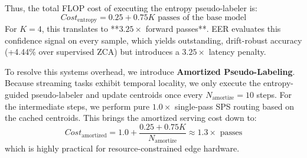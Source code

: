 Thus, the total FLOP cost of executing the entropy pseudo-labeler is:
\begin{equation}
Cost_{\text{entropy}} = 0.25 + 0.75 K \text{ passes of the base model}
\label{eq:cost_entropy}
\end{equation}
For $K=4$, this translates to **$3.25\times$ forward passes**. EER evaluates this confidence signal on every sample, which yields outstanding, drift-robust accuracy (+4.44\% over supervised ZCA) but introduces a $3.25\times$ latency penalty. 

To resolve this systems overhead, we introduce \textbf{Amortized Pseudo-Labeling}. Because streaming tasks exhibit temporal locality, we only execute the entropy-guided pseudo-labeler and update centroids once every $N_{\text{amortize}} = 10$ steps. For the intermediate steps, we perform pure $1.0\times$ single-pass SPS routing based on the cached centroids. This brings the amortized serving cost down to:
\begin{equation}
Cost_{\text{amortized}} = 1.0 + \frac{0.25 + 0.75 K}{N_{\text{amortize}}} \approx 1.3\times \text{ passes}
\label{eq:amortized_complexity}
\end{equation}
which is highly practical for resource-constrained edge hardware.
